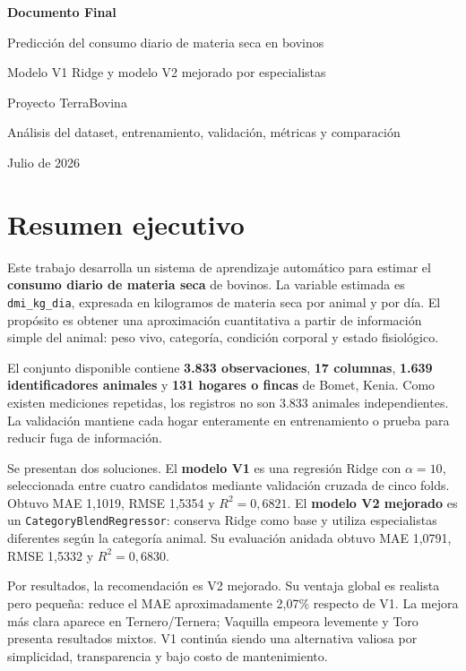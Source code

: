 \documentclass[11pt,a4paper]{article}
\newcommand{\codigo}[1]{\nolinkurl{#1}}
\begin{document}
\begin{titlepage}
\centering
\vspace*{2.3cm}
{\Huge\bfseries Documento Final\par}
\vspace{0.7cm}
{\LARGE Predicción del consumo diario de materia seca en bovinos\par}
\vspace{0.35cm}
{\Large Modelo V1 Ridge y modelo V2 mejorado por especialistas\par}
\vfill
{\large Proyecto TerraBovina\par}
\vspace{0.3cm}
{\large Análisis del dataset, entrenamiento, validación, métricas y comparación\par}
\vfill
{\large Julio de 2026\par}
\end{titlepage}

\tableofcontents
\newpage

\section{Resumen ejecutivo}

Este trabajo desarrolla un sistema de aprendizaje automático para estimar el \textbf{consumo diario de materia seca} de bovinos. La variable estimada es \codigo{dmi_kg_dia}, expresada en kilogramos de materia seca por animal y por día. El propósito es obtener una aproximación cuantitativa a partir de información simple del animal: peso vivo, categoría, condición corporal y estado fisiológico.

El conjunto disponible contiene \textbf{3.833 observaciones}, \textbf{17 columnas}, \textbf{1.639 identificadores animales} y \textbf{131 hogares o fincas} de Bomet, Kenia. Como existen mediciones repetidas, los registros no son 3.833 animales independientes. La validación mantiene cada hogar enteramente en entrenamiento o prueba para reducir fuga de información.

Se presentan dos soluciones. El \textbf{modelo V1} es una regresión Ridge con $\alpha=10$, seleccionada entre cuatro candidatos mediante validación cruzada de cinco folds. Obtuvo MAE 1,1019, RMSE 1,5354 y $R^2=0,6821$. El \textbf{modelo V2 mejorado} es un \codigo{CategoryBlendRegressor}: conserva Ridge como base y utiliza especialistas diferentes según la categoría animal. Su evaluación anidada obtuvo MAE 1,0791, RMSE 1,5332 y $R^2=0,6830$.

Por resultados, la recomendación es V2 mejorado. Su ventaja global es realista pero pequeña: reduce el MAE aproximadamente 2,07\% respecto de V1. La mejora más clara aparece en Ternero/Ternera; Vaquilla empeora levemente y Toro presenta resultados mixtos. V1 continúa siendo una alternativa valiosa por simplicidad, transparencia y bajo costo de mantenimiento.
\end{document}
